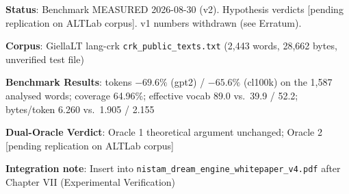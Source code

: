 \documentclass[11pt,oneside]{article}
\begin{document}
\bigskip
\noindent
\textbf{Status}: Benchmark MEASURED 2026-08-30 (v2). Hypothesis verdicts [pending replication on ALTLab corpus]. v1 numbers withdrawn (see Erratum).

\textbf{Corpus}: GiellaLT lang-crk \texttt{crk\_public\_texts.txt} (2,443 words, 28,662 bytes, unverified test file)

\textbf{Benchmark Results}: tokens $-69.6\%$ (gpt2) / $-65.6\%$ (cl100k) on the 1,587 analysed words; coverage 64.96\%; effective vocab 89.0 vs.\ 39.9 / 52.2; bytes/token 6.260 vs.\ 1.905 / 2.155

\textbf{Dual-Oracle Verdict}: Oracle 1 theoretical argument unchanged; Oracle 2 [pending replication on ALTLab corpus]

\textbf{Integration note}: Insert into \texttt{nistam\_dream\_engine\_whitepaper\_v4.pdf} after Chapter VII (Experimental Verification)
\end{document}
